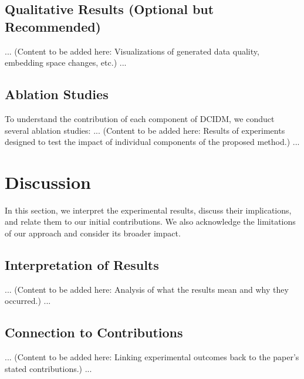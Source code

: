 \documentclass{article}
\begin{document}
\subsection{Qualitative Results (Optional but Recommended)}
... (Content to be added here: Visualizations of generated data quality, embedding space changes, etc.) ...

\subsection{Ablation Studies}
To understand the contribution of each component of DCIDM, we conduct several ablation studies:
... (Content to be added here: Results of experiments designed to test the impact of individual components of the proposed method.) ...

\section{Discussion}
In this section, we interpret the experimental results, discuss their implications, and relate them to our initial contributions. We also acknowledge the limitations of our approach and consider its broader impact.

\subsection{Interpretation of Results}
... (Content to be added here: Analysis of what the results mean and why they occurred.) ...

\subsection{Connection to Contributions}
... (Content to be added here: Linking experimental outcomes back to the paper's stated contributions.) ...
\end{document}
